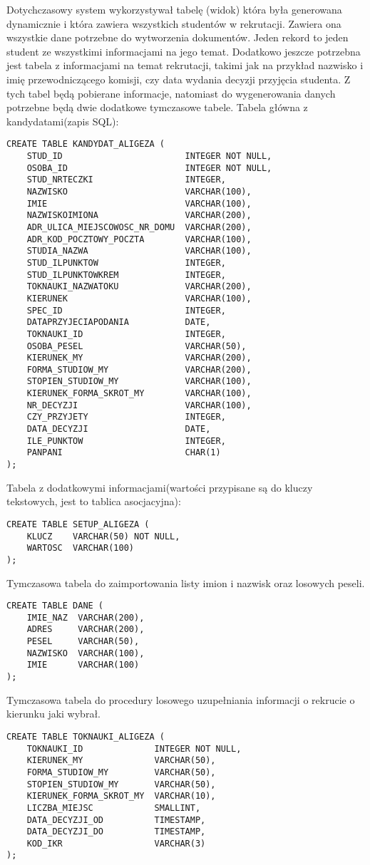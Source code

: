 Dotychczasowy system wykorzystywał tabelę (widok) która była generowana dynamicznie i która zawiera wszystkich studentów w rekrutacji. Zawiera ona wszystkie dane potrzebne do wytworzenia dokumentów. Jeden rekord to jeden student ze wszystkimi informacjami na jego temat. Dodatkowo jeszcze potrzebna jest tabela z informacjami na temat rekrutacji, takimi jak na przykład nazwisko i imię przewodniczącego komisji, czy data wydania decyzji przyjęcia studenta. Z tych tabel będą pobierane informacje, natomiast do wygenerowania danych potrzebne będą dwie dodatkowe tymczasowe tabele.
Tabela główna z kandydatami(zapis SQL):
\begin{verbatim}
CREATE TABLE KANDYDAT_ALIGEZA (
    STUD_ID                        INTEGER NOT NULL,
    OSOBA_ID                       INTEGER NOT NULL,
    STUD_NRTECZKI                  INTEGER,
    NAZWISKO                       VARCHAR(100),
    IMIE                           VARCHAR(100),
    NAZWISKOIMIONA                 VARCHAR(200),
    ADR_ULICA_MIEJSCOWOSC_NR_DOMU  VARCHAR(200),
    ADR_KOD_POCZTOWY_POCZTA        VARCHAR(100),
    STUDIA_NAZWA                   VARCHAR(100),
    STUD_ILPUNKTOW                 INTEGER,
    STUD_ILPUNKTOWKREM             INTEGER,
    TOKNAUKI_NAZWATOKU             VARCHAR(200),
    KIERUNEK                       VARCHAR(100),
    SPEC_ID                        INTEGER,
    DATAPRZYJECIAPODANIA           DATE,
    TOKNAUKI_ID                    INTEGER,
    OSOBA_PESEL                    VARCHAR(50),
    KIERUNEK_MY                    VARCHAR(200),
    FORMA_STUDIOW_MY               VARCHAR(200),
    STOPIEN_STUDIOW_MY             VARCHAR(100),
    KIERUNEK_FORMA_SKROT_MY        VARCHAR(100),
    NR_DECYZJI                     VARCHAR(100),
    CZY_PRZYJETY                   INTEGER,
    DATA_DECYZJI                   DATE,
    ILE_PUNKTOW                    INTEGER,
    PANPANI                        CHAR(1)
);
\end{verbatim}
Tabela z dodatkowymi informacjami(wartości przypisane są do kluczy tekstowych, jest to tablica asocjacyjna):
\begin{verbatim}
CREATE TABLE SETUP_ALIGEZA (
    KLUCZ    VARCHAR(50) NOT NULL,
    WARTOSC  VARCHAR(100)
);
\end{verbatim}
Tymczasowa tabela do zaimportowania listy imion i nazwisk oraz losowych peseli.
\begin{verbatim}
CREATE TABLE DANE (
    IMIE_NAZ  VARCHAR(200),
    ADRES     VARCHAR(200),
    PESEL     VARCHAR(50),
    NAZWISKO  VARCHAR(100),
    IMIE      VARCHAR(100)
);
\end{verbatim}
Tymczasowa tabela do procedury losowego uzupełniania informacji o rekrucie o kierunku jaki wybrał.
\begin{verbatim}
CREATE TABLE TOKNAUKI_ALIGEZA (
    TOKNAUKI_ID              INTEGER NOT NULL,
    KIERUNEK_MY              VARCHAR(50),
    FORMA_STUDIOW_MY         VARCHAR(50),
    STOPIEN_STUDIOW_MY       VARCHAR(50),
    KIERUNEK_FORMA_SKROT_MY  VARCHAR(10),
    LICZBA_MIEJSC            SMALLINT,
    DATA_DECYZJI_OD          TIMESTAMP,
    DATA_DECYZJI_DO          TIMESTAMP,
    KOD_IKR                  VARCHAR(3)
);
\end{verbatim}
